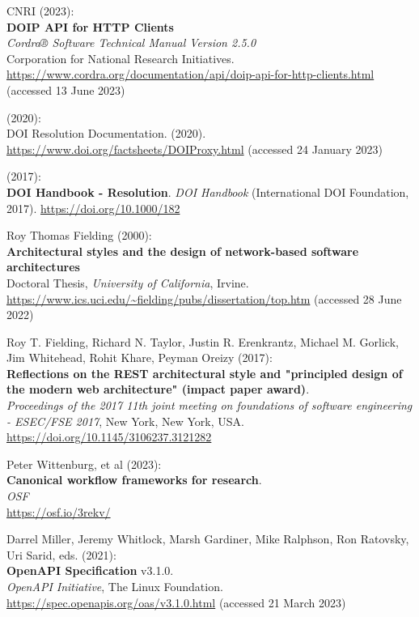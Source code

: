 \begin{thebibliography}{9}
CNRI (2023): \\
\textbf{DOIP API for HTTP Clients} \\
\emph{Cordra® Software Technical Manual Version 2.5.0}\\
Corporation for National Research Initiatives.
\url{https://www.cordra.org/documentation/api/doip-api-for-http-clients.html}
(accessed 13 June 2023)

(2020): \\
{DOI Resolution Documentation}. (2020).
\url{https://www.doi.org/factsheets/DOIProxy.html} (accessed 24 January
2023)

(2017): \\
\textbf{{DOI Handbook} - {Resolution}}. \emph{{DOI Handbook}}
({International DOI Foundation}, 2017).
\url{https://doi.org/10.1000/182}

Roy Thomas Fielding (2000): \\
\textbf{Architectural styles and the design
of network-based software architectures}\\
Doctoral Thesis, 
\emph{University of California}, Irvine.
\url{https://www.ics.uci.edu/~fielding/pubs/dissertation/top.htm}
(accessed 28 June 2022)

Roy T. Fielding, Richard N. Taylor, Justin R. Erenkrantz, Michael M.
Gorlick, Jim Whitehead, Rohit Khare, Peyman Oreizy (2017): \\
\textbf{Reflections on the {REST} architectural style and "principled
design of the modern web architecture" (impact paper award)}. \\
\emph{Proceedings of the 2017 11th joint meeting on foundations of software engineering - {ESEC}/{FSE} 2017}, New York, New York, USA.\\
\url{https://doi.org/10.1145/3106237.3121282}

Peter Wittenburg, et al (2023): \\
\textbf{Canonical workflow frameworks for research}. \\
\emph{OSF}\\
\url{https://osf.io/3rekv/}

Darrel Miller, Jeremy Whitlock, Marsh Gardiner, Mike Ralphson, Ron
Ratovsky, Uri Sarid, eds. (2021): \\
\textbf{OpenAPI Specification} v3.1.0.\\
\emph{OpenAPI Initiative}, The Linux Foundation.
\url{https://spec.openapis.org/oas/v3.1.0.html} (accessed 21
March 2023)


\end{thebibliography}
